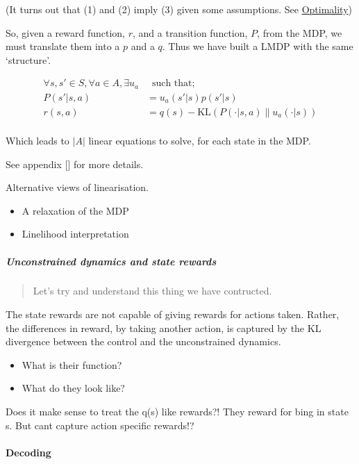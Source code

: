 (It turns out that (1) and (2) imply (3) given some assumptions. See
\href{}{Optimality})

So, given a reward function, \(r\), and a transition function, \(P\),
from the MDP, we must translate them into a \(p\) and a \(q\). Thus we
have built a LMDP with the same `structure'.

\begin{align}
\forall s, s' \in S, \forall a \in A, \exists u_a& \;\;\text{such that;} \\
P(s' | s, a) &= u_a(s'|s)p(s'|s) \tag{1}\\
r(s, a) &= q(s) - \text{KL}(P(\cdot | s, a) \parallel u_a(\cdot| s) ) \tag{2}\\
\end{align}

Which leads to \(|A|\) linear equations to solve, for each state in the
MDP.

See appendix {[}{]} for more details.

Alternative views of linearisation.

\begin{itemize}
\tightlist
\item
  A relaxation of the MDP
\item
  Linelihood interpretation
\end{itemize}

\hypertarget{unconstrained-dynamics-and-state-rewards}{%
\subparagraph{Unconstrained dynamics and state
rewards}\label{unconstrained-dynamics-and-state-rewards}}

\begin{quote}
Let's try and understand this thing we have contructed.
\end{quote}

The state rewards are not capable of giving rewards for actions taken.
Rather, the differences in reward, by taking another action, is captured
by the KL divergence between the control and the unconstrained dynamics.

\begin{itemize}
\tightlist
\item
  What is their function?
\item
  What do they look like?
\end{itemize}

Does it make sense to treat the q(s) like rewards?! They reward for bing
in state s. But cant capture action specific rewards!?

\hypertarget{decoding}{%
\paragraph{Decoding}\label{decoding}}

